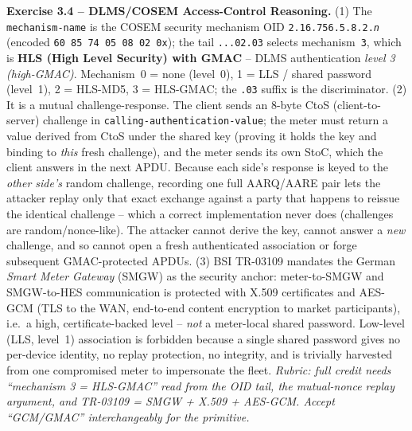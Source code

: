 \documentclass[11pt,a4paper]{article}
\begin{document}
\begin{solutionbox}
\textbf{Exercise 3.4 -- DLMS/COSEM Access-Control Reasoning.}
(1) The \texttt{mechanism-name} is the COSEM security mechanism OID
\texttt{2.16.756.5.8.2.\textit{n}} (encoded \texttt{60 85 74 05 08 02
0x}); the tail \texttt{...02.03} selects mechanism~\texttt{3}, which is
\textbf{HLS (High Level Security) with GMAC} -- DLMS authentication
\emph{level 3 (high-GMAC)}. Mechanism~0 = none (level~0), 1 = LLS / shared
password (level~1), 2 = HLS-MD5, 3 = HLS-GMAC; the \texttt{.03} suffix is
the discriminator.
(2) It is a mutual challenge-response. The client sends an 8-byte CtoS
(client-to-server) challenge in \texttt{calling-authentication-value}; the
meter must return a value derived from CtoS under the shared key (proving it
holds the key and binding to \emph{this} fresh challenge), and the meter
sends its own StoC, which the client answers in the next APDU. Because each
side's response is keyed to the \emph{other side's} random challenge,
recording one full AARQ/AARE pair lets the attacker replay only that exact
exchange against a party that happens to reissue the identical challenge --
which a correct implementation never does (challenges are random/nonce-like).
The attacker cannot derive the key, cannot answer a \emph{new} challenge,
and so cannot open a fresh authenticated association or forge subsequent
GMAC-protected APDUs.
(3) BSI TR-03109 mandates the German \emph{Smart Meter Gateway} (SMGW) as the
security anchor: meter-to-SMGW and SMGW-to-HES communication is protected
with X.509 certificates and AES-GCM (TLS to the WAN, end-to-end content
encryption to market participants), i.e.\ a high, certificate-backed level
-- \emph{not} a meter-local shared password. Low-level (LLS, level~1)
association is forbidden because a single shared password gives no per-device
identity, no replay protection, no integrity, and is trivially harvested
from one compromised meter to impersonate the fleet.
\textit{Rubric: full credit needs ``mechanism 3 = HLS-GMAC'' read from the
OID tail, the mutual-nonce replay argument, and TR-03109 = SMGW + X.509 +
AES-GCM. Accept ``GCM/GMAC'' interchangeably for the primitive.}
\end{solutionbox}
\end{document}
